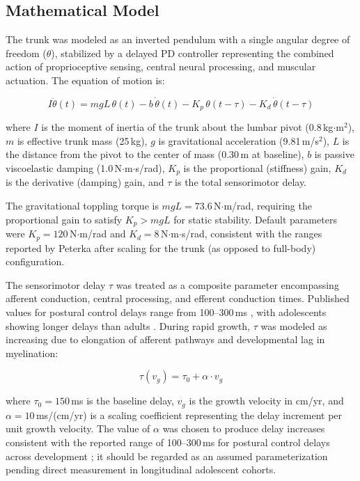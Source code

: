 \documentclass[12pt,a4paper]{article}
\begin{document}
\subsection{Mathematical Model}

The trunk was modeled as an inverted pendulum with a single angular degree of freedom ($\theta$), stabilized by a delayed PD controller representing the combined action of proprioceptive sensing, central neural processing, and muscular actuation. The equation of motion is:

\begin{equation}
I\ddot{\theta}(t) = mgL\,\theta(t) - b\,\dot{\theta}(t) - K_p\,\theta(t-\tau) - K_d\,\dot{\theta}(t-\tau)
\label{eq:dde}
\end{equation}

\noindent where $I$ is the moment of inertia of the trunk about the lumbar pivot (0.8\,kg$\cdot$m$^2$), $m$ is effective trunk mass (25\,kg), $g$ is gravitational acceleration (9.81\,m/s$^2$), $L$ is the distance from the pivot to the center of mass (0.30\,m at baseline), $b$ is passive viscoelastic damping (1.0\,N$\cdot$m$\cdot$s/rad), $K_p$ is the proportional (stiffness) gain, $K_d$ is the derivative (damping) gain, and $\tau$ is the total sensorimotor delay.

The gravitational toppling torque is $mgL = 73.6$\,N$\cdot$m/rad, requiring the proportional gain to satisfy $K_p > mgL$ for static stability. Default parameters were $K_p = 120$\,N$\cdot$m/rad and $K_d = 8$\,N$\cdot$m$\cdot$s/rad, consistent with the ranges reported by Peterka \citep{peterka2002sensorimotor} after scaling for the trunk (as opposed to full-body) configuration.

The sensorimotor delay $\tau$ was treated as a composite parameter encompassing afferent conduction, central processing, and efferent conduction times. Published values for postural control delays range from 100--300\,ms \citep{peterka2002sensorimotor, winter1995human}, with adolescents showing longer delays than adults \citep{hirabayashi2009age}. During rapid growth, $\tau$ was modeled as increasing due to elongation of afferent pathways and developmental lag in myelination:

\begin{equation}
\tau(v_g) = \tau_0 + \alpha \cdot v_g
\label{eq:tau}
\end{equation}

\noindent where $\tau_0 = 150$\,ms is the baseline delay, $v_g$ is the growth velocity in cm/yr, and $\alpha = 10$\,ms/(cm/yr) is a scaling coefficient representing the delay increment per unit growth velocity. The value of $\alpha$ was chosen to produce delay increases consistent with the reported range of 100--300\,ms for postural control delays across development \citep{peterka2002sensorimotor, hirabayashi2009age}; it should be regarded as an assumed parameterization pending direct measurement in longitudinal adolescent cohorts.
\end{document}

